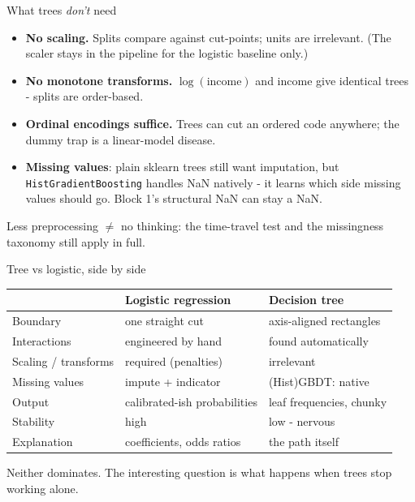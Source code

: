 \documentclass[10pt,aspectratio=169]{beamer}
\begin{document}
\begin{frame}{What trees \emph{don't} need}
  \begin{itemize}
    \item \textbf{No scaling.} Splits compare against cut-points; units are
          irrelevant. (The scaler stays in the pipeline for the logistic
          baseline only.)
    \item \textbf{No monotone transforms.} $\log(\text{income})$ and income
          give identical trees - splits are order-based.
    \item \textbf{Ordinal encodings suffice.} Trees can cut an ordered code
          anywhere; the dummy trap is a linear-model disease.
    \item \textbf{Missing values}: plain sklearn trees still want
          imputation, but \texttt{HistGradientBoosting} handles NaN
          \alert{natively} - it learns which side missing values should go.
          Block 1's structural NaN can stay a NaN.
  \end{itemize}
  \vspace{0.4em}
  \begin{center}\small
    Less preprocessing $\ne$ no thinking: the time-travel test and the
    missingness taxonomy still apply in full.
  \end{center}
\end{frame}

\begin{frame}{Tree vs logistic, side by side}
  \small
  \begin{center}
  \begin{tabular}{@{}lll@{}}
    \toprule
     & Logistic regression & Decision tree \\
    \midrule
    Boundary & one straight cut & axis-aligned rectangles \\
    Interactions & engineered by hand & found automatically \\
    Scaling / transforms & required (penalties) & irrelevant \\
    Missing values & impute + indicator & (Hist)GBDT: native \\
    Output & calibrated-ish probabilities & leaf frequencies, chunky \\
    Stability & high & \alert{low - nervous} \\
    Explanation & coefficients, odds ratios & the path itself \\
    \bottomrule
  \end{tabular}
  \end{center}
  \vspace{0.5em}
  \begin{center}
    Neither dominates. The interesting question is what happens when trees
    \alert{stop working alone}.
  \end{center}
\end{frame}
\end{document}
